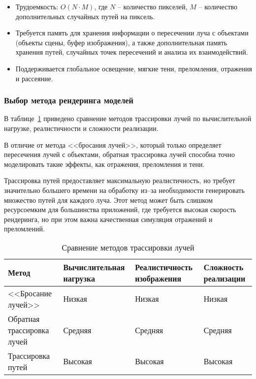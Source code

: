 \begin{itemize}
	\item Трудоемкость: $O(N  \cdot M)$, где $N$ -- количество пикселей, $M$ -- количество дополнительных случайных путей на пиксель.
	\item Требуется память для хранения информации о пересечении луча с объектами (объекты сцены, буфер изображения), а также дополнительная память хранения путей, случайных точек пересечений и анализа их взаимодействий.
	\item Поддерживается глобальное освещение, мягкие тени, преломления, отражения и рассеяние.
\end{itemize}

\subsubsection*{Выбор метода рендеринга моделей}

В таблице~\ref{table:rt} приведено сравнение методов трассировки лучей по вычислительной нагрузке, реалистичности и сложности реализации.

В отличие от метода <<бросания лучей>>, который только определяет пересечения лучей с объектами, обратная трассировка лучей способна точно моделировать такие эффекты, как отражения, преломления и тени. 

Трассировка путей предоставляет максимальную реалистичность, но требует значительно большего времени на обработку из--за необходимости генерировать множество путей для каждого луча. Этот метод может быть слишком ресурсоемким для большинства приложений, где требуется высокая скорость рендеринга, но при этом важна качественная симуляция отражений и преломлений.

\begin{table}[h!]
	\centering
	\small
	\renewcommand{\arraystretch}{1.5}
	\caption{Сравнение методов трассировки лучей}
	\begin{tabular}{|>{\raggedright\arraybackslash}m{3.8cm}|>{\raggedright\arraybackslash}m{3.8cm}|>{\raggedright\arraybackslash}m{3.8cm}|>{\raggedright\arraybackslash}m{3cm}|}
		\hline
		\textbf{Метод} & \textbf{Вычислительная нагрузка} & \textbf{Реалистичность изображения} & \textbf{Сложность реализации} \\ \hline
		<<Бросание лучей>> & Низкая & Низкая & Низкая \\ \hline
		Обратная трассировка лучей & Средняя & Средняя & Средняя \\ \hline
		Трассировка путей & Высокая & Высокая & Высокая \\ \hline
	\end{tabular}
	\label{table:rt}
\end{table}


